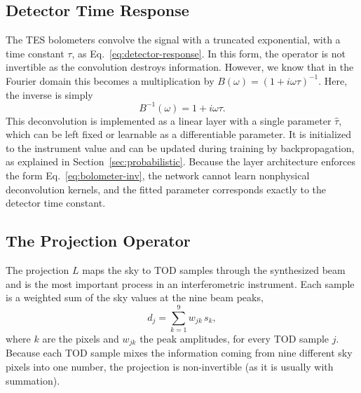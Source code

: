 \documentclass[a4paper,11pt]{article}
\begin{document}
\subsection{Detector Time Response}
\label{subsec:detector}

The TES bolometers convolve the signal with a truncated exponential, with a time constant $\tau$, as Eq.~\ref{eq:detector-response}. In this form, the operator is not invertible as the convolution destroys information. However, we know that in the Fourier domain this becomes a multiplication by
$B(\omega) = (1 + i\omega\tau)^{-1}$.  Here, the inverse is simply
\begin{equation}
    B^{-1}(\omega) = 1 + i\omega\tau.
    \label{eq:bolometer-inv}
\end{equation}
This deconvolution is implemented as a linear layer with a single parameter $\hat{\tau}$, which can be left fixed or learnable as a differentiable parameter. It is initialized to the instrument value and can be updated during training by backpropagation, as explained in Section~\ref{sec:probabilistic}. Because the layer architecture enforces the form Eq.~\ref{eq:bolometer-inv}, the network cannot learn nonphysical deconvolution kernels, and the fitted parameter corresponds exactly to the detector time constant.

\subsection{The Projection Operator}
\label{subsec:projection}

The projection $L$ maps the sky to TOD samples through the synthesized beam and is the most important process in an interferometric instrument. Each sample is a weighted sum of the sky values at the nine beam peaks,
\begin{equation}
    d_j = \sum_{k=1}^{9} w_{jk}\,s_{k},
    \label{eq:proj-sum}
\end{equation}
where $k$ are the pixels and $w_{jk}$ the peak amplitudes, for every TOD sample $j$. Because each TOD sample mixes the information coming from nine different sky pixels into one number, the projection is non-invertible (as it is usually with summation). 
\end{document}

